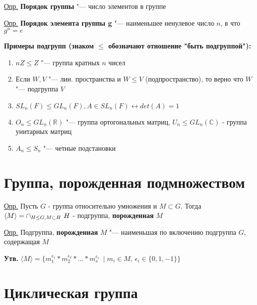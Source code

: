 \documentclass{article}
\begin{document}
\vspace{10pt}

\par \underline{Опр.} \textbf{Порядок группы} "--- число элементов в группе

\vspace{10pt}

\par \underline{Опр.} \textbf{Порядок элемента группы g} "--- наименьшее ненулевое число $n$, в что $g^n = e$


\vspace{10pt}


\textbf{Примеры подгрупп (знаком $\le$ обозначают отношение "быть подгруппой"):}
\begin{enumerate}
	\item $nZ \le Z$ "--- группа кратных $n$ чисел
	\item Если $W, V$ "--- лин. пространства и $W \le V$ (подпространство), то верно что $W$ "--- подгруппа $V$  
	\item $SL_n(F) \le GL_n(F), A \in SL_n(F) \leftrightarrow det(A) = 1$
	\item $O_n \le GL_n(\mathbb{R})$ "--- группа ортогональных матриц, $U_n \le GL_n(\mathbb{C})$ - группа унитарных матриц
	\item $A_n \le S_n$ "--- четные подстановки
\end{enumerate}
\section{Группа, порожденная подмножеством}

\vspace{10pt}

\par \underline{Опр.} Пусть $G$ - группа относительно умножения и $M \subset G$. Тогда $\langle M \rangle = \cap_{\small H \le G, M \subset H} \  H$ - подгруппа, \textbf{порожденная} $M$

\vspace{10pt}

\par \underline{Опр.} Подгруппа, \textbf{порожденная} $M$ "--- наименьшая по включению подгруппа $G$, содержащая $M$

\vspace{10pt}

\textbf{Утв.} $\langle M \rangle = \{m_1^{\epsilon_1}*m_2^{\epsilon_2}*...*m_s^{\epsilon_s} \  \mid m_i \in M, \  \epsilon_i \in \{0,1,-1\}\}$
\section{Циклическая группа}
\end{document}

